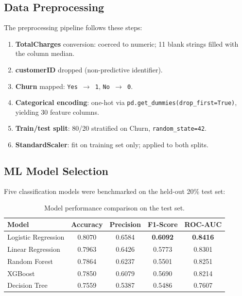 \subsection{Data Preprocessing}
\label{sec:preprocessing}

The preprocessing pipeline follows these steps:
\begin{enumerate}[leftmargin=*]
    \item \textbf{TotalCharges} conversion: coerced to numeric; 11 blank strings filled with the column median.
    \item \textbf{customerID} dropped (non-predictive identifier).
    \item \textbf{Churn} mapped: \texttt{Yes $\rightarrow$ 1}, \texttt{No $\rightarrow$ 0}.
    \item \textbf{Categorical encoding}: one-hot via \texttt{pd.get\_dummies(drop\_first=True)}, yielding 30 feature columns.
    \item \textbf{Train/test split}: 80/20 stratified on Churn, \texttt{random\_state=42}.
    \item \textbf{StandardScaler}: fit on training set only; applied to both splits.
\end{enumerate}

\subsection{ML Model Selection}
\label{sec:model_selection}

Five classification models were benchmarked on the held-out 20\% test set:

\begin{table}[h]
\centering
\begin{tabular}{@{}lcccc@{}}
\toprule
\textbf{Model} & \textbf{Accuracy} & \textbf{Precision} & \textbf{F1-Score} & \textbf{ROC-AUC} \\
\midrule
Logistic Regression   & 0.8070 & 0.6584 & \textbf{0.6092} & \textbf{0.8416} \\
Linear Regression     & 0.7963 & 0.6426 & 0.5773 & 0.8301 \\
Random Forest         & 0.7864 & 0.6237 & 0.5501 & 0.8251 \\
XGBoost               & 0.7850 & 0.6079 & 0.5690 & 0.8214 \\
Decision Tree         & 0.7559 & 0.5387 & 0.5486 & 0.7607 \\
\bottomrule
\end{tabular}
\caption{Model performance comparison on the test set.}
\label{tab:models}
\end{table}

